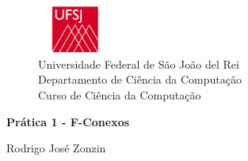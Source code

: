 \begin{figure}[t]
	\centering
	\includegraphics[width=2.5cm]{ufsj}\\
	
	{\large Universidade Federal de São João del Rei\\
		Departamento de Ciência da Computação\\
		Curso de Ciência da Computação\\}
	\label{fig:ufsj}
\end{figure}
{\Large
	\begin{center}
		\textbf{Prática 1 - F-Conexos}
		
	\end{center}
}

{\large 
	
	\begin{center}
		Rodrigo José Zonzin \\
	
	\end{center}	
}